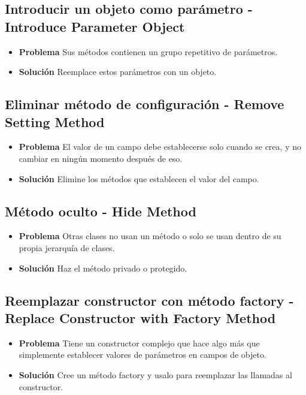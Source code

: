 \documentclass[11pt,a4paper,oneside]{book}
\begin{document}


\subsection{Introducir un objeto como parámetro - Introduce Parameter Object}
\label{introduceparameterobject}
\begin{itemize}
    \item \textbf{Problema} Sus métodos contienen un grupo repetitivo de parámetros.   
   \item \textbf{Solución} Reemplace estos parámetros con un objeto.
\end{itemize}

\subsection{Eliminar método de configuración - Remove Setting Method}
\label{removesettingmethod}
\begin{itemize}
    \item \textbf{Problema} El valor de un campo debe establecerse solo cuando se crea, y no cambiar en ningún momento después de eso.
    \item \textbf{Solución}  Elimine los métodos que establecen el valor del campo.
\end{itemize}

\subsection{Método oculto - Hide Method}
\label{hidemethod}
\begin{itemize}
    \item \textbf{Problema} Otras clases no usan un método o solo se usan dentro de su propia jerarquía de clases.
    \item \textbf{Solución} Haz el método privado o protegido.
\end{itemize}

\subsection{Reemplazar constructor con método factory - Replace Constructor with Factory Method}
\label{replaceconstructorwithfactorymethod}
\begin{itemize}
    \item \textbf{Problema} Tiene un constructor complejo que hace algo más que simplemente establecer valores de parámetros en campos de objeto.
    \item \textbf{Solución} Cree un método factory y usalo para reemplazar las llamadas al  constructor.
\end{itemize}
    
\end{document}
